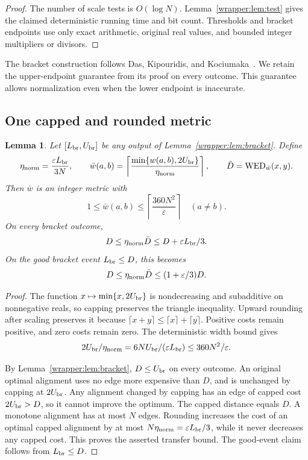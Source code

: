 \documentclass[11pt]{article}
\newtheorem{lemma}[theorem]{Lemma}
\theoremstyle{definition}
\newcommand{\WED}{\operatorname{WED}}
\newcommand{\eps}{\varepsilon}
\newcommand{\1}{\mathbf 1}
\begin{document}
\begin{proof}
The number of scale tests is $O(\log N)$. Lemma~\ref{wrapper:lem:test} gives the
claimed deterministic running time and bit count. Thresholds and bracket
endpoints use only exact arithmetic, original real values, and bounded
integer multipliers or divisors.
\end{proof}

The bracket construction follows Das, Kipouridis, and
Kociumaka~\cite{dkk}. We retain the upper-endpoint guarantee from its
proof on every outcome. This guarantee allows normalization even when
the lower endpoint is inaccurate.

\subsection{One capped and rounded metric}\label{wrapper:sec:normalization}

\begin{lemma}\label{wrapper:lem:normalize}
Let $[L_{\rm br},U_{\rm br}]$ be any output of Lemma~\ref{wrapper:lem:bracket}. Define
\[
\eta_{\rm norm}=\frac{\eps L_{\rm br}}{3N},\qquad
\bar w(a,b)=\left\lceil\frac{\min\{w(a,b),2U_{\rm br}\}}{\eta_{\rm norm}}\right\rceil,
\qquad \bar D=\WED_{\bar w}(x,y).
\]
Then $\bar w$ is an integer metric with
\[
1\le\bar w(a,b)\le
\left\lceil\frac{360N^2}{\eps}\right\rceil\quad(a\ne b).
\]
On every bracket outcome,
\[
D\le\eta_{\rm norm}\bar D\le D+\eps L_{\rm br}/3.
\]
On the good bracket event $L_{\rm br}\le D$, this becomes
\[
D\le\eta_{\rm norm}\bar D\le(1+\eps/3)D.
\]
\end{lemma}
\begin{proof}
The function $x\mapsto\min\{x,2U_{\rm br}\}$ is nondecreasing and subadditive
on nonnegative reals, so capping preserves the triangle inequality.
Upward rounding after scaling preserves it because
$\lceil x+y\rceil\le\lceil x\rceil+\lceil y\rceil$.
Positive costs remain positive, and zero costs remain zero.
The deterministic width bound gives
\[
2U_{\rm br}/\eta_{\rm norm}=6NU_{\rm br}/(\eps L_{\rm br})\le360N^2/\eps.
\]

By Lemma~\ref{wrapper:lem:bracket}, $D\le U_{\rm br}$ on every outcome. An original optimal
alignment uses no edge more expensive than $D$, and is unchanged by
capping at $2U_{\rm br}$. Any alignment changed by capping has an edge of capped
cost $2U_{\rm br}>D$, so it cannot improve the optimum.
The capped distance equals $D$. A monotone alignment has at most $N$ edges.
Rounding increases the cost of an optimal capped alignment by at most
$N\eta_{\rm norm}=\eps L_{\rm br}/3$, while it never decreases any capped cost. This proves
the asserted transfer bound. The good-event claim follows from $L_{\rm br}\le D$.
\end{proof}
\end{document}
